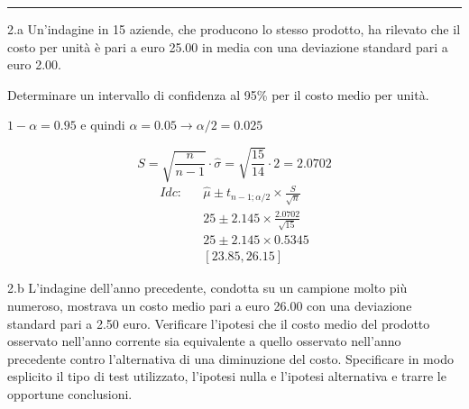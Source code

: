\documentclass[
  11pt,
]{book}
\theoremstyle{mytheoremstyle}
\theoremstyle{mydefstyle}
\newenvironment{sol}
  {
  \begin{tcolorbox}[enhanced,breakable,arc=0.1mm,boxrule=1pt,colback=white,colframe=iblue,
  title=\bf \fontfamily{lmss}\selectfont \hspace{.5 cm} Soluzione,drop fuzzy shadow]

}{
\end{tcolorbox}
  }
\begin{document}
\begin{center}\rule{0.5\linewidth}{0.5pt}\end{center}

2.a Un'indagine in 15 aziende, che producono lo stesso prodotto,
ha rilevato che il costo per unità è pari a euro 25.00
in media con una deviazione standard pari a euro 2.00.

Determinare un intervallo di confidenza al 95\%
per il costo medio per unità.

\begin{sol}
\(1-\alpha =0.95\) e quindi \(\alpha=0.05\rightarrow \alpha/2=0.025\)

\[
      S  =\sqrt{\frac {n}{n-1}}\cdot\hat\sigma =
     \sqrt{\frac { 15 }{ 14 }}\cdot 2 = 2.0702 
\]
\begin{eqnarray*}
  Idc: & &  \hat\mu \pm  t_{n-1;\alpha/2} \times \frac{S}{\sqrt{n}} \\
     & &  25 \pm  2.145 \times \frac{ 2.0702 }{\sqrt{ 15 }} \\
     & &  25 \pm  2.145 \times  0.5345 \\
     & & [ 23.85 ,  26.15 ]
\end{eqnarray*}

\end{sol}

2.b L'indagine dell'anno precedente, condotta
su un campione molto più numeroso, mostrava un costo medio
pari a euro 26.00 con una deviazione standard pari a 2.50 euro.
Verificare l'ipotesi che il costo medio del prodotto osservato
nell'anno corrente sia equivalente a quello osservato nell'anno
precedente contro l'alternativa di una diminuzione del costo.
Specificare in modo esplicito il tipo di test utilizzato,
l'ipotesi nulla e l'ipotesi alternativa e trarre le opportune
conclusioni.
\end{document}
